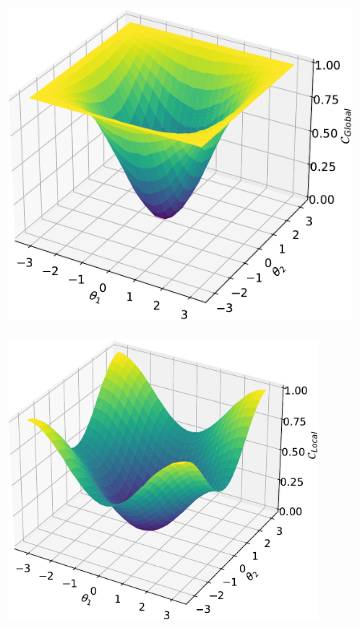 \begin{figure}[t]
    \centering
    \begin{subfigure}[b]{0.48\textwidth}
    \begin{minipage}
    {.03\textwidth}
        \caption{}
        \label{fig:barren-plateau-1}
    \end{minipage}%
    \begin{minipage}{0.90\textwidth}
        \includegraphics[width=.9\textwidth]{figures/qleet/global_cost_loss_landscape.pdf}
    \end{minipage}
    \end{subfigure}
    \begin{subfigure}[b]{0.48\linewidth}
    \begin{minipage}{.08\textwidth}
        \caption{}
        \label{fig:barren-plateau-2}
    \end{minipage}%
    \begin{minipage}{0.9\textwidth}
        \includegraphics[width=0.9\textwidth]{figures/qleet/local_cost_loss_landscape.pdf}

\end{minipage}
\end{subfigure}
\end{figure}
